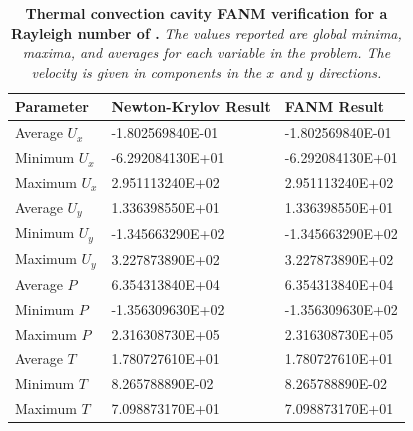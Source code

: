 \begin{table}[h!]
  \begin{center}
    \begin{tabular}{lll}\hline\hline
      \multicolumn{1}{l}{Parameter}& 
      \multicolumn{1}{l}{Newton-Krylov Result}&
      \multicolumn{1}{l}{FANM Result}\\
      \hline
      Average $U_x$ & -1.802569840E-01 & -1.802569840E-01 \\
      Minimum $U_x$ & -6.292084130E+01 & -6.292084130E+01 \\
      Maximum $U_x$ & 2.951113240E+02 & 2.951113240E+02 \\
      \hline
      Average $U_y$ & 1.336398550E+01 & 1.336398550E+01 \\
      Minimum $U_y$ & -1.345663290E+02 & -1.345663290E+02 \\
      Maximum $U_y$ & 3.227873890E+02 & 3.227873890E+02 \\
      \hline
      Average $P$ & 6.354313840E+04 & 6.354313840E+04 \\
      Minimum $P$ & -1.356309630E+02 & -1.356309630E+02 \\
      Maximum $P$ & 2.316308730E+05 & 2.316308730E+05 \\
      \hline
      Average $T$ & 1.780727610E+01 & 1.780727610E+01 \\
      Minimum $T$ & 8.265788890E-02 & 8.265788890E-02 \\
      Maximum $T$ & 7.098873170E+01 & 7.098873170E+01 \\
      \hline\hline
    \end{tabular}
  \end{center}
  \caption{\textbf{Thermal convection cavity FANM verification for a
      Rayleigh number of .} \textit{The values reported are
      global minima, maxima, and averages for each variable in the
      problem. The velocity is given in components in the $x$ and $y$
      directions.}}
  \label{tab:convection_ra1e6_results}
\end{table}

